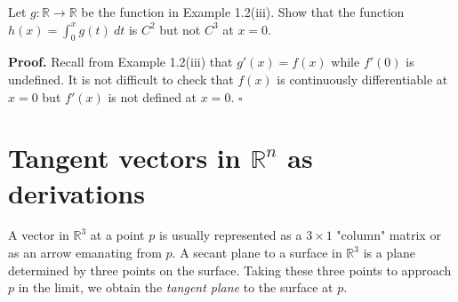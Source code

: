 \documentclass[a4paper]{article}
\newcommand{\R}{\mathbb{R}}
\begin{document}
Let $g : \R \to \R$ be the function in Example 1.2(iii). Show that the function $h(x) = \int_0^x g(t)\ dt$ is $C^2$ but not $C^3$ at $x = 0$.

\textbf{Proof.} Recall from Example 1.2(iii) that $g'(x) = f(x)$ while $f'(0)$ is undefined. It is not difficult to check that $f(x)$ is continuously differentiable at $x = 0$ but $f'(x)$ is not defined at $x = 0$. $\square$

\section{Tangent vectors in $\R^n$ as derivations}

A vector in $\R^3$ at a point $p$ is usually represented as a $3\times1$ "column" matrix or as an arrow emanating from $p$. A secant plane to a surface in $\R^3$ is a plane determined by three points on the surface. Taking these three points to approach $p$ in the limit, we obtain the \emph{tangent plane} to the surface at $p$.
\end{document}
